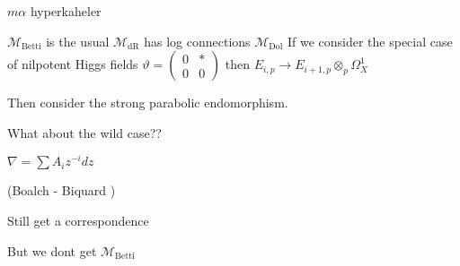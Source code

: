 $m \alpha $ hyperkaheler 

$\mathcal{M}_{\mathrm{Betti}} $ is the usual 
$\mathcal{M}_{\mathrm{dR}}$ has log connections 
$\mathcal{M}_{\mathrm{Dol}} $ If we consider the special case of nilpotent Higgs fields 
$\vartheta =\left( \begin{array}{rr} 0 &  * \\ 0 & 0 \end{array} \right) $ 
    then $E_{i, p} \rightarrow E_{i+1, p } \otimes _p \Omega^1 _ X $ 

    Then consider the strong parabolic endomorphism. 


    What about the wild case??

    $ \nabla = \sum A_i z^{-i } dz $ 

    (Boalch - Biquard ) 

    Still get a correspondence 

    But we dont get $\mathcal{M}_{\mathrm{Betti}}$







 

